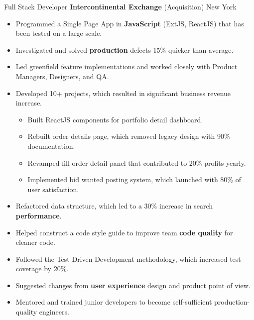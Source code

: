 \documentclass[11pt,a4paper,sans]{moderncv}   %
\begin{document}
{Full Stack Developer}
{\textbf{Intercontinental Exchange}}
{(Acquisition)}
{New York}
{
	\begin{itemize}
	  \item{Programmed a Single Page App in \textbf{JavaScript} (ExtJS, ReactJS) that has been tested on a large scale.}
	  \item{Investigated and solved \textbf{production} defects 15\% quicker than average.}
	  \item{Led greenfield feature implementations and worked closely with Product Managers, Designers, and QA.}
    \item{Developed 10+ projects, which resulted in significant business revenue increase.}
    \begin{itemize}
      \item{Built ReactJS components for portfolio detail dashboard.}
      \item{Rebuilt order details page, which removed legacy design with 90\% documentation. }
      \item{Revamped fill order detail panel that contributed to 20\% profits yearly.}
      \item{Implemented bid wanted posting system, which launched with 80\% of user satisfaction.}
    \end{itemize}
    \item{Refactored data structure, which led to a 30\% increase in search \textbf{performance}.}
    \item{Helped construct a code style guide to improve team \textbf{code quality} for cleaner code.}
    \item{Followed the Test Driven Development methodology, which increased test coverage by 20\%.}
    \item{Suggested changes from \textbf{user experience} design and product point of view.} %
    \item{Mentored and trained junior developers to become self-sufficient production-quality engineers.}
	\end{itemize}
}
\end{document}
